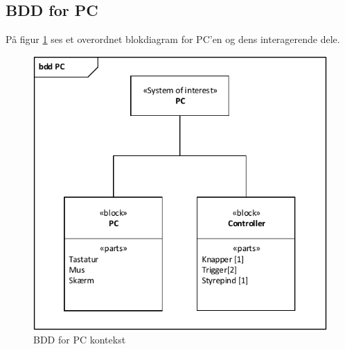 \subsection{BDD for PC}

På figur \ref{fig:bdd_pc} ses et overordnet blokdiagram for PC'en og dens interagerende dele. 

\begin{figure}[h]
\centering
\includegraphics[scale=1]{../fig/diagrammer/pc/bdd_pc.pdf}
\caption{BDD for PC kontekst}
\label{fig:bdd_pc}
\end{figure}